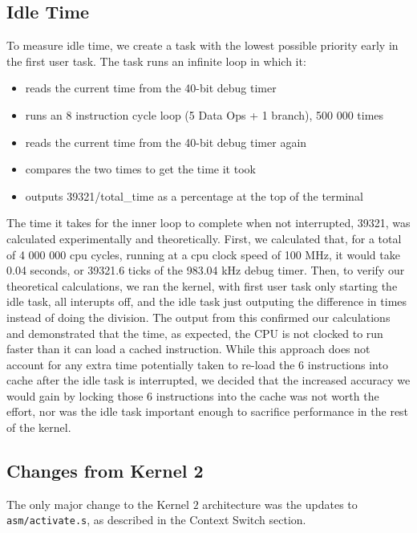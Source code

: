 \documentclass{article}
\begin{document}
\subsection{Idle Time}
To measure idle time, we create a task with the lowest possible priority early in the first user task. The task runs an infinite loop in which it:
\begin{itemize}
    \item reads the current time from the 40-bit debug timer
    \item runs an 8 instruction cycle loop (5 Data Ops + 1 branch), 500 000 times
    \item reads the current time from the 40-bit debug timer again
    \item compares the two times to get the time it took
    \item outputs 39321/total\_time as a percentage at the top of the terminal
\end{itemize}
The time it takes for the inner loop to complete when not interrupted, 39321, was calculated experimentally and theoretically. First, we calculated that, for a total of 4 000 000 cpu cycles, running at a cpu clock speed of 100 MHz, it would take 0.04 seconds, or 39321.6 ticks of the 983.04 kHz debug timer. Then, to verify our theoretical calculations, we ran the kernel, with first user task only starting the idle task, all interupts off, and the idle task just outputing the difference in times instead of doing the division. The output from this confirmed our calculations and demonstrated that the time, as expected, the CPU is not clocked to run faster than it can load a cached instruction. While this approach does not account for any extra time potentially taken to re-load the 6 instructions into cache after the idle task is interrupted, we decided that the increased accuracy we would gain by locking those 6 instructions into the cache was not worth the effort, nor was the idle task important enough to sacrifice performance in the rest of the kernel.
\subsection{Changes from Kernel 2}
    The only major change to the Kernel $2$ architecture was the updates to \verb|asm/activate.s|, as described in the Context Switch section.
\end{document}
